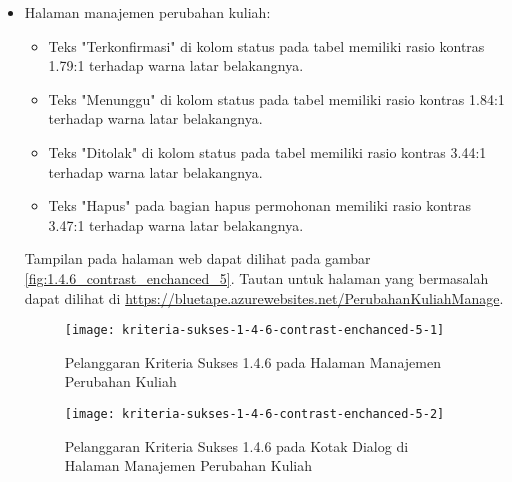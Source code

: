 \begin{itemize}
    \item Halaman manajemen perubahan kuliah: 
    \begin{itemize}
        \item Teks "Terkonfirmasi" di kolom status pada tabel memiliki rasio kontras 1.79:1 terhadap warna latar belakangnya.
        \item Teks "Menunggu" di kolom status pada tabel memiliki rasio kontras 1.84:1 terhadap warna latar belakangnya.
        \item Teks "Ditolak" di kolom status pada tabel memiliki rasio kontras 3.44:1 terhadap warna latar belakangnya.
        \item Teks "Hapus" pada bagian hapus permohonan memiliki rasio kontras 3.47:1 terhadap warna latar belakangnya.
    \end{itemize}
    Tampilan pada halaman web dapat dilihat pada gambar \ref{fig:1.4.6_contrast_enchanced_5}. Tautan untuk halaman yang bermasalah dapat dilihat di \url{https://bluetape.azurewebsites.net/PerubahanKuliahManage}.
    \begin{figure}[H]
        \centering  
        \texttt{[image: kriteria-sukses-1-4-6-contrast-enchanced-5-1]}  
        \caption[Pelanggaran Kriteria Sukses 1.4.6 pada Halaman Manajemen Perubahan Kuliah]{Pelanggaran Kriteria Sukses 1.4.6 pada Halaman Manajemen Perubahan Kuliah}
        \label{fig:1.4.6_contrast_enchanced_5_1}  
    \end{figure} 
    
    \begin{figure}[H]
        \centering  
        \texttt{[image: kriteria-sukses-1-4-6-contrast-enchanced-5-2]}  
        \caption[Pelanggaran Kriteria Sukses 1.4.6 pada Kotak Dialog di Halaman Manajemen Perubahan Kuliah]{Pelanggaran Kriteria Sukses 1.4.6 pada Kotak Dialog di Halaman Manajemen Perubahan Kuliah}
        \label{fig:1.4.6_contrast_enchanced_5_2}  
    \end{figure}


\end{itemize}
